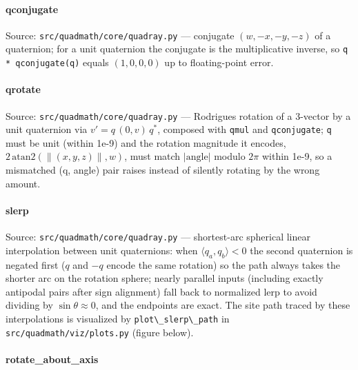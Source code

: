 \documentclass[
  10pt,
]{article}
\newcommand{\passthrough}[1]{#1}
\renewcommand{\texttt}[1]{%
    \colorbox{codebg}{\color{codefg}\ttfamily #1}%
}
\begin{document}
\paragraph{\texorpdfstring{\texttt{qconjugate}}{qconjugate}}\label{code:qconjugate}

Source: \passthrough{\lstinline!src/quadmath/core/quadray.py!} ---
conjugate \((w, -x, -y, -z)\) of a quaternion; for a unit quaternion the
conjugate is the multiplicative inverse, so
\passthrough{\lstinline!q * qconjugate(q)!} equals \((1, 0, 0, 0)\) up
to floating-point error.

\paragraph{\texorpdfstring{\texttt{qrotate}}{qrotate}}\label{code:qrotate}

Source: \passthrough{\lstinline!src/quadmath/core/quadray.py!} ---
Rodrigues rotation of a 3-vector by a unit quaternion via
\(v' = q\,(0, v)\,q^*\), composed with \passthrough{\lstinline!qmul!}
and \passthrough{\lstinline!qconjugate!}; \passthrough{\lstinline!q!}
must be unit (within 1e-9) and the rotation magnitude it encodes,
\(2\,\mathrm{atan2}(\lVert (x, y, z) \rVert, w)\), must match
\(|\mathrm{angle}|\) modulo \(2\pi\) within 1e-9, so a mismatched (q,
angle) pair raises instead of silently rotating by the wrong amount.

\paragraph{\texorpdfstring{\texttt{slerp}}{slerp}}\label{code:slerp}

Source: \passthrough{\lstinline!src/quadmath/core/quadray.py!} ---
shortest-arc spherical linear interpolation between unit quaternions:
when \(\langle q_a, q_b\rangle < 0\) the second quaternion is negated
first (\(q\) and \(-q\) encode the same rotation) so the path always
takes the shorter arc on the rotation sphere; nearly parallel inputs
(including exactly antipodal pairs after sign alignment) fall back to
normalized lerp to avoid dividing by \(\sin\theta \approx 0\), and the
endpoints are exact. The site path traced by these interpolations is
visualized by \passthrough{\lstinline!plot\_slerp\_path!} in
\passthrough{\lstinline!src/quadmath/viz/plots.py!} (figure below).

\paragraph{\texorpdfstring{\texttt{rotate\_about\_axis}}{rotate\_about\_axis}}\label{code:rotate_about_axis}
\end{document}
